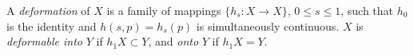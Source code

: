 A \textit{deformation} of $X$ is a family of mappings $\{h_s: X \to X\}$, $0 \leq s \leq 1$, such that $h_0$ is the identity and $h(s,p) = h_s(p)$ is simultaneously continuous. $X$ is \textit{deformable into} $Y$ if $h_1 X \subset Y$, and \textit{onto} $Y$ if $h_1 X = Y$.
